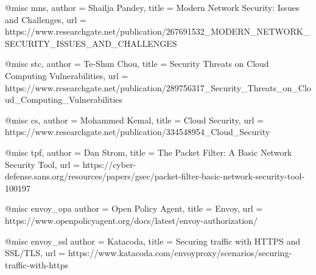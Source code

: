 @misc {mns,
  author = {Shailja Pandey},
  title = {Modern Network Security: Issues and Challenges},
  url = {https://www.researchgate.net/publication/267691532_MODERN_NETWORK_SECURITY_ISSUES_AND_CHALLENGES}
}

@misc {stc,
  author = {Te-Shun Chou},
  title = {Security Threats on Cloud Computing Vulnerabilities},
  url = {https://www.researchgate.net/publication/289756317_Security_Threats_on_Cloud_Computing_Vulnerabilities}
}

@misc {cs,
  author = {Mohammed Kemal},
  title = {Cloud Security},
  url = {https://www.researchgate.net/publication/334548954_Cloud_Security}
}

@misc {tpf,
  author = {Dan Strom},
  title = {The Packet Filter: A Basic Network Security Tool},
  url = {https://cyber-defense.sans.org/resources/papers/gsec/packet-filter-basic-network-security-tool-100197}
}

@misc {envoy_opa
  author = {Open Policy Agent},
  title = {Envoy},
  url = {https://www.openpolicyagent.org/docs/latest/envoy-authorization/}
}

@misc {envoy_ssl
  author = {Katacoda},
  title = {Securing traffic with HTTPS and SSL/TLS},
  url = {https://www.katacoda.com/envoyproxy/scenarios/securing-traffic-with-https}
}
